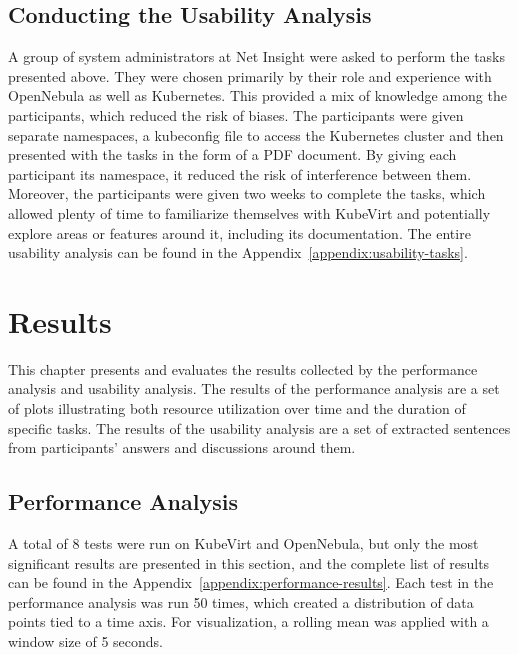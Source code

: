 \documentclass{kththesis}
\begin{document}
\begin{enumerate}
\section{Conducting the Usability Analysis}
A group of system administrators at Net Insight were asked to perform the tasks presented above. They were chosen primarily by their role and experience with OpenNebula as well as Kubernetes. This provided a mix of knowledge among the participants, which reduced the risk of biases. The participants were given separate namespaces, a kubeconfig file to access the Kubernetes cluster and then presented with the tasks in the form of a PDF document. By giving each participant its namespace, it reduced the risk of interference between them. Moreover, the participants were given two weeks to complete the tasks, which allowed plenty of time to familiarize themselves with KubeVirt and potentially explore areas or features around it, including its documentation. The entire usability analysis can be found in the Appendix\ \ref{appendix:usability-tasks}.

\cleardoublepage
\chapter{Results}
This chapter presents and evaluates the results collected by the performance analysis and usability analysis. The results of the performance analysis are a set of plots illustrating both resource utilization over time and the duration of specific tasks. The results of the usability analysis are a set of extracted sentences from participants' answers and discussions around them.

\section{Performance Analysis}
\label{sec:method:performance-analysis}

\def\figurewidth{1}
\def\labelprefix{fig}

A total of 8 tests were run on KubeVirt and OpenNebula, but only the most significant results are presented in this section, and the complete list of results can be found in the Appendix\ \ref{appendix:performance-results}. Each test in the performance analysis was run 50 times, which created a distribution of data points tied to a time axis. For visualization, a rolling mean was applied with a window size of 5 seconds. 


\end{enumerate}
\end{document}
